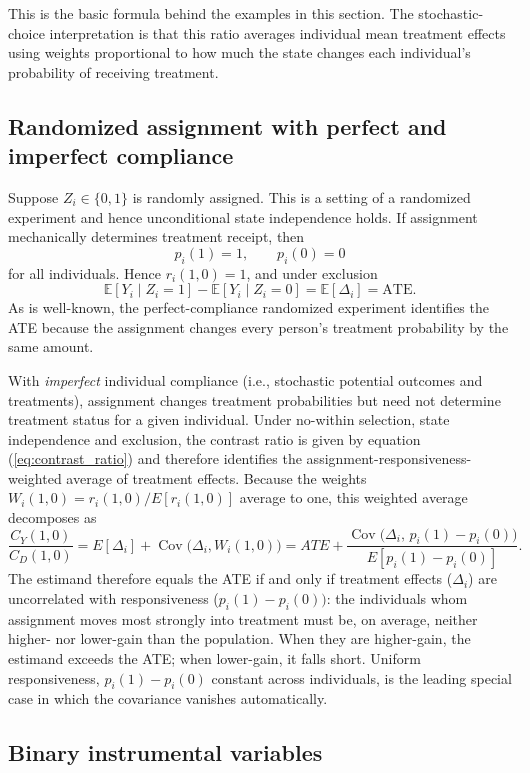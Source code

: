 \documentclass[11pt]{article}
\newcommand{\ate}{\mathrm{ATE}}
\DeclareMathOperator{\Cov}{Cov}
\newcommand{\E}{\mathbb{E}}
\newcommand{\1}{\mathbf{1}}
\begin{document}
This is the basic formula behind the examples in this section. The stochastic-choice interpretation is that this ratio averages individual
mean treatment effects using weights proportional to how much the state changes
each individual's probability of receiving treatment.
\subsection{Randomized assignment with perfect and imperfect compliance}

Suppose $Z_i\in\{0,1\}$ is randomly assigned. This is a setting of a randomized experiment and hence unconditional state independence holds. If assignment mechanically determines treatment receipt, then
\[
        p_i(1)=1,
        \qquad
        p_i(0)=0
\]
for all individuals. Hence $r_i(1,0)=1$, and under exclusion
\[
        \E[Y_i\mid Z_i=1]-\E[Y_i\mid Z_i=0]=\E[\Delta_i]=\ate.
\]
As is well-known, the perfect-compliance randomized experiment identifies the ATE because the assignment changes every person's treatment probability by the same amount.

With \emph{imperfect} individual compliance (i.e., stochastic potential outcomes and treatments), assignment changes treatment probabilities but need not determine treatment status for a given individual. Under no-within selection, state independence and exclusion, the contrast ratio is given by equation (\ref{eq:contrast_ratio}) and therefore identifies the assignment-responsiveness-weighted average of treatment effects. Because the weights $W_i(1,0)=r_i(1,0)/E[r_i(1,0)]$ average to one, this
weighted average decomposes as
\[
\frac{C_Y(1,0)}{C_D(1,0)}
= E[\Delta_i] + \Cov\bigl(\Delta_i, W_i(1,0)\bigr)
= ATE + \frac{\Cov\bigl(\Delta_i,\, p_i(1)-p_i(0)\bigr)}{E[p_i(1)-p_i(0)]}.
\]
The estimand therefore equals the ATE if and only if treatment effects ($\Delta_i$) are
uncorrelated with responsiveness ($p_i(1)-p_i(0))$: the individuals whom assignment moves most
strongly into treatment must be, on average, neither higher- nor lower-gain
than the population. When they are higher-gain, the estimand exceeds the ATE;
when lower-gain, it falls short. Uniform responsiveness, $p_i(1)-p_i(0)$
constant across individuals, is the leading special case in which the
covariance vanishes automatically.

\subsection{Binary instrumental variables}
\end{document}
